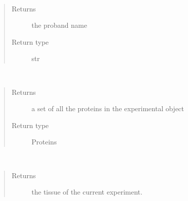 \documentclass[letterpaper,10pt,english]{sphinxmanual}
\begin{document}
\begin{fulllineitems}
\begin{fulllineitems}
\label{\detokenize{IPTK.Classes:IPTK.Classes.Experiment.Experiment.get_proband_name}}~\begin{quote}\begin{description}
\item[{Returns}] \leavevmode
the proband name

\item[{Return type}] \leavevmode
str

\end{description}\end{quote}

\end{fulllineitems}


\begin{fulllineitems}
\label{\detokenize{IPTK.Classes:IPTK.Classes.Experiment.Experiment.get_proteins}}~\begin{quote}\begin{description}
\item[{Returns}] \leavevmode
a set of all the proteins in the experimental object

\item[{Return type}] \leavevmode
Proteins

\end{description}\end{quote}

\end{fulllineitems}


\begin{fulllineitems}
\label{\detokenize{IPTK.Classes:IPTK.Classes.Experiment.Experiment.get_tissue}}~\begin{quote}\begin{description}
\item[{Returns}] \leavevmode
the tissue of the current experiment.


\end{description}
\end{quote}
\end{fulllineitems}
\end{fulllineitems}
\end{document}
